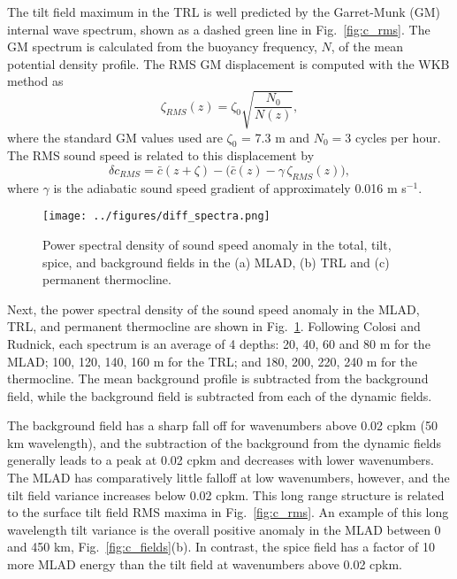 \documentclass[preprint,NumberedRefs]{JASA}
\begin{document}
The tilt field maximum in the TRL is well predicted by the Garret-Munk (GM) internal wave spectrum, shown as a dashed green line in Fig.~\ref{fig:c_rms}. The GM spectrum is calculated from the buoyancy frequency, $N$, of the mean potential density profile. The RMS GM displacement is computed with the WKB method as
\begin{equation*}
    \zeta_{RMS}(z) = \zeta_0 \sqrt{\frac{N_0}{N(z)}},
\end{equation*}
where the standard GM values used are $\zeta_0$ = 7.3 m and $N_0=3$ cycles per hour.\cite{colosi2016sound} The RMS sound speed is related to this displacement by
\begin{equation*}
    \delta c_{RMS} = \bar{c}(z+\zeta)-\big(\bar{c}(z) - \gamma \, \zeta_{RMS}(z)\big),
\end{equation*}
where $\gamma$ is the adiabatic sound speed gradient of approximately 0.016 m s$^{-1}$.

\begin{figure}
\texttt{[image: ../figures/diff\_spectra.png]}
        \caption{\label{fig:spectra}{Power spectral density of sound speed anomaly in the total, tilt, spice, and background fields in the (a) MLAD, (b) TRL and (c) permanent thermocline.}}
\end{figure}
Next, the power spectral density of the sound speed anomaly in the MLAD, TRL, and permanent thermocline are shown in Fig.~\ref{fig:spectra}. Following Colosi and Rudnick,\cite{colosi2020observations} each spectrum is an average of 4 depths: 20, 40, 60 and 80 m for the MLAD; 100, 120, 140, 160 m for the TRL; and 180, 200, 220, 240 m for the thermocline. The mean background profile is subtracted from the background field, while the background field is subtracted from each of the dynamic fields.

The background field has a sharp fall off for wavenumbers above 0.02 cpkm (50 km wavelength), and the subtraction of the background from the dynamic fields generally leads to a peak at 0.02 cpkm and decreases with lower wavenumbers. The MLAD has comparatively little falloff at low wavenumbers, however, and the tilt field variance increases below 0.02 cpkm. This long range structure is related to the surface tilt field RMS maxima in Fig.~\ref{fig:c_rms}. An example of this long wavelength tilt variance is the overall positive anomaly in the MLAD between 0 and 450 km, Fig.~\ref{fig:c_fields}(b). In contrast, the spice field has a factor of 10 more MLAD energy than the tilt field at wavenumbers above 0.02 cpkm.
\end{document}
